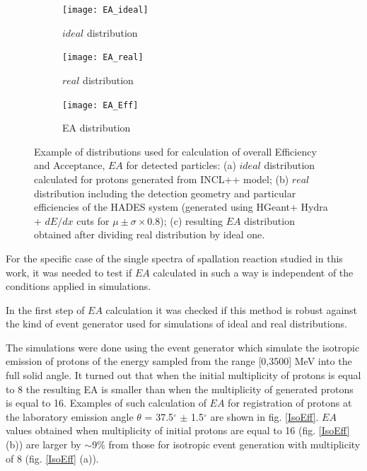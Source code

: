     \begin{figure}[!ht]
    \centering
	\begin{subfigure}[b]{0.45\textwidth}
		\texttt{[image: EA\_ideal]}
		\caption{\label{EAideal1} $ideal$ distribution }
	\end{subfigure}
	\begin{subfigure}[b]{0.45\textwidth}
		\texttt{[image: EA\_real]}
		\caption{\label{EAreal2} $real$ distribution}
		\end{subfigure}
	\begin{subfigure}[b]{0.45\textwidth}
		\texttt{[image: EA\_Eff]}
		\caption{\label{EAreal3} EA distribution}
		\end{subfigure}		
	\caption{\label{EA_INCL} Example of distributions used for calculation of 
	overall Efficiency and Acceptance,  $EA$ for detected particles: 
	(a) 
$ideal$ distribution calculated for protons generated from INCL++ model; (b)  $real$ distribution including the detection geometry and particular efficiencies of the HADES system  (generated using HGeant+ Hydra + 
$dE/dx$ cuts for $\mu\pm\sigma \times  0.8$); (c) resulting $EA$ distribution obtained 
after dividing real distribution by 
ideal one.}
\end{figure}




For the specific case of the single spectra of spallation reaction studied in this work, 
it was needed to test if $EA$ calculated in such a way is independent of the conditions applied in simulations.

In the first step of $EA$ calculation it was checked if 
this method is robust against the kind of event generator used for simulations 
of ideal and real distributions.

The simulations were done using the event generator which simulate the isotropic emission of protons of the energy sampled from the range [0,3500] MeV into the full solid angle. It turned out that when the initial multiplicity of protons is equal to 8 
the resulting EA is smaller than when the multiplicity of generated protons is equal to 16.
Examples of such calculation of $EA$ for registration  of protons at the laboratory emission angle $\theta$ = 37.5$^{\circ}$ $\pm$ 1.5$^{\circ}$ are shown in fig. \ref{IsoEff}. $EA$ values obtained when multiplicity of initial protons are equal to 16 (fig. \ref{IsoEff} (b)) are larger by $\sim$9\% from those for isotropic event generation with multiplicity of 8 (fig. \ref{IsoEff} (a)).  

